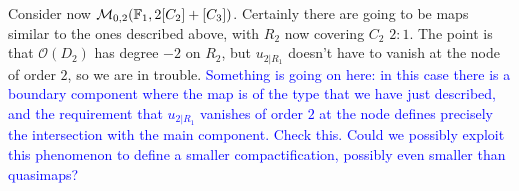 Consider now $\mathcal{M}_{0,2}(\mathbb F_1,2[C_2]+[C_3])$. Certainly there are going to be maps similar to the ones described above, with $R_2$ now covering $C_2$ $2\colon 1$. The point is that $\mathcal O(D_2)$ has degree $-2$ on $R_2$, but $u_{2|R_1}$ doesn't have to vanish at the node of order $2$, so we are in trouble. \textcolor{blue}{Something is going on here: in this case there is a boundary component where the map is of the type that we have just described, and the requirement that $u_{2|R_1}$ vanishes of order $2$ at the node defines precisely the intersection with the main component. Check this. Could we possibly exploit this phenomenon to define a smaller compactification, possibly even smaller than quasimaps?}